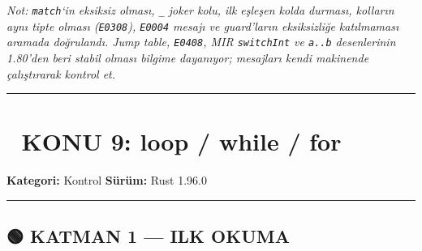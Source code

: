 \documentclass[12pt,a4paper]{article}
\begin{document}
\emph{Not: \texttt{match}`in eksiksiz olması, \texttt{\_} joker kolu, ilk eşleşen kolda durması, kolların aynı tipte olması (\texttt{E0308}), \texttt{E0004} mesajı ve guard'ların eksiksizliğe katılmaması aramada doğrulandı. Jump table, \texttt{E0408}, MIR \texttt{switchInt} ve \texttt{a..b} desenlerinin 1.80'den beri stabil olması bilgime dayanıyor; mesajları kendi makinende çalıştırarak kontrol et.}

\begin{center}\rule{0.5\linewidth}{0.5pt}\end{center}

\section{📘 KONU 9: loop / while / for}\label{konu-9-loop-while-for}

\textbf{Kategori:} Kontrol \textbar{} \textbf{Sürüm:} Rust 1.96.0

\begin{center}\rule{0.5\linewidth}{0.5pt}\end{center}

\subsection{🟢 KATMAN 1 --- ILK OKUMA}\label{katman-1-—-ilk-okuma-8}
\end{document}
